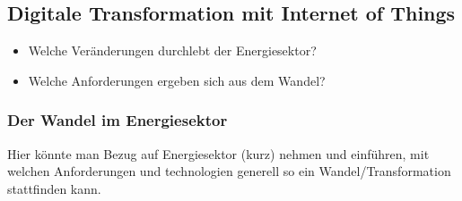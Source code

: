 \subsection{Digitale Transformation mit Internet of Things}
\begin{itemize}
  \item Welche Veränderungen durchlebt der Energiesektor?
  \item Welche Anforderungen ergeben sich aus dem Wandel?
\end{itemize}

\subsubsection{Der Wandel im Energiesektor}
Hier könnte man Bezug auf Energiesektor (kurz) nehmen und einführen, mit welchen Anforderungen und technologien generell so ein Wandel/Transformation stattfinden kann.
